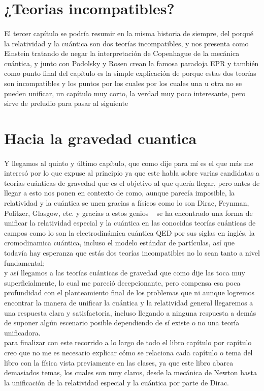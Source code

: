 \documentclass[12pt]{article}
\begin{document}
\section*{¿Teorias incompatibles?}
\paragraph*{}
\textsf{El tercer capítulo se podría resumir en la misma historia de siempre, del porqué la relatividad y la cuántica son dos teorías incompatibles,
y nos presenta como Einstein tratando de negar la interpretación de Copenhague de la mecánica cuántica, y junto con Podolsky y Rosen crean la famosa paradoja EPR
y también como punto final del capítulo es la simple explicación de porque estas dos teorías son incompatibles y los puntos por los cuales
por los cuales una u otra no se pueden unificar, un capítulo muy corto, la verdad muy poco interesante, pero sirve de preludio para pasar al siguiente}
\section*{Hacia la gravedad cuantica}
\paragraph*{}
\textsf{Y llegamos al quinto y último capítulo, que como dije para mí es el que más me interesó por lo que expuse al 
principio ya que este habla sobre varias candidatas a teorías cuánticas de gravedad que es el objetivo al que quería 
llegar, pero antes de llegar a esto nos ponen en contexto de como, aunque parecía imposible, la relatividad y la cuántica se unen
gracias a físicos como lo son Dirac, Feynman, Politzer, Glasgow, etc. y gracias a estos genios  
se ha encontrado una forma de unificar la relatividad especial y la cuántica en las conocidas teorías cuánticas de campos como lo son 
la electrodinámica cuántica QED por sus siglas en inglés, la cromodinamica cuántica, incluso el modelo estándar 
de partículas, así que todavía hay esperanza que estás dos teorías incompatibles no lo sean tanto a nivel fundamental;\\
y así llegamos a las teorías cuánticas de gravedad que como dije las toca muy superficialmente, lo cual me pareció decepcionante, pero compensa esa poca profundidad con el 
planteamiento final de los problemas que ni aunque logremos encontrar la manera de unificar la cuántica y la 
relatividad general llegaremos a una respuesta clara y satisfactoria, incluso llegando a ninguna respuesta a demás de suponer algún escenario posible dependiendo
de sí existe o no una teoría unificadora.\\
para finalizar con este recorrido a lo largo de todo el libro capítulo por capítulo
creo que no me es necesario explicar cómo se relaciona cada capítulo o tema del libro con la física vista previamente 
en las clases, ya que este libro abarca demasiados temas, los cuales son muy claros, desde la mecánica de Newton hasta la unificación de la
relatividad especial y la cuántica por parte de Dirac.}
\end{document}
